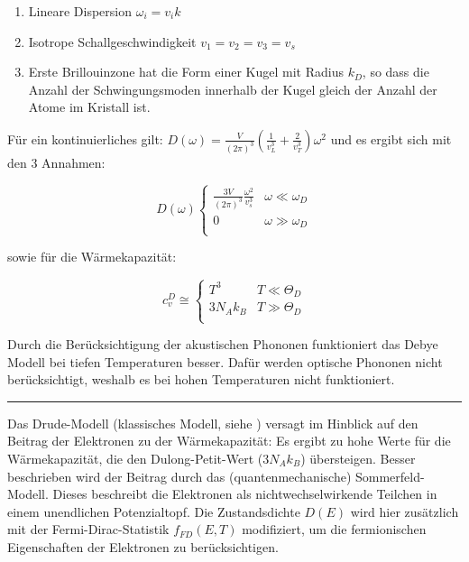 \begin{enumerate}
    \item Lineare Dispersion $\omega_i = v_i k$
    \item Isotrope Schallgeschwindigkeit $v_1 = v_2 = v_3 = v_s$
    \item Erste Brillouinzone hat die Form einer Kugel mit Radius $k_D$, so dass die Anzahl der Schwingungsmoden innerhalb der Kugel gleich der Anzahl der Atome im Kristall ist.     
\end{enumerate}

Für ein kontinuierliches gilt: $D(\omega) = \frac{V}{(2\pi)^3} \left( \frac{1}{v_L^3} + \frac{2}{v_T^3}\right) \omega^2$ und es ergibt sich mit den 3 Annahmen:

\[ D(\omega) \left\{ \begin{array}{ll}
    \frac{3V}{(2\pi)^3} \frac{\omega^2}{v_s^3} & \omega \ll \omega_D \\
    0  & \omega \gg \omega_D \\
    \end{array} \right.
\] 

sowie für die Wärmekapazität:

\[ c_v^D \cong \left\{ \begin{array}{ll}
    T^3 & T \ll \Theta_D \\
    3N_Ak_B  & T \gg \Theta_D \\
    \end{array} \right.
\] 

Durch die Berücksichtigung der akustischen Phononen funktioniert das Debye Modell bei tiefen Temperaturen besser. Dafür werden optische Phononen nicht berücksichtigt, weshalb es bei hohen Temperaturen nicht funktioniert. 

\vspace{.2cm}
\hrule
\vspace{.2cm}
 
\label{q:58}

Das Drude-Modell (klassisches Modell, siehe ) versagt im Hinblick auf den Beitrag der Elektronen zu der Wärmekapazität: Es ergibt zu hohe Werte für die Wärmekapazität, die den Dulong-Petit-Wert ($3N_Ak_B$) übersteigen. Besser beschrieben wird der Beitrag durch das (quantenmechanische) Sommerfeld-Modell. Dieses beschreibt die Elektronen als nichtwechselwirkende Teilchen in einem unendlichen Potenzialtopf. Die Zustandsdichte $D(E)$ wird hier zusätzlich mit der Fermi-Dirac-Statistik $f_{FD} (E, T)$ modifiziert, um die fermionischen Eigenschaften der Elektronen zu berücksichtigen.

